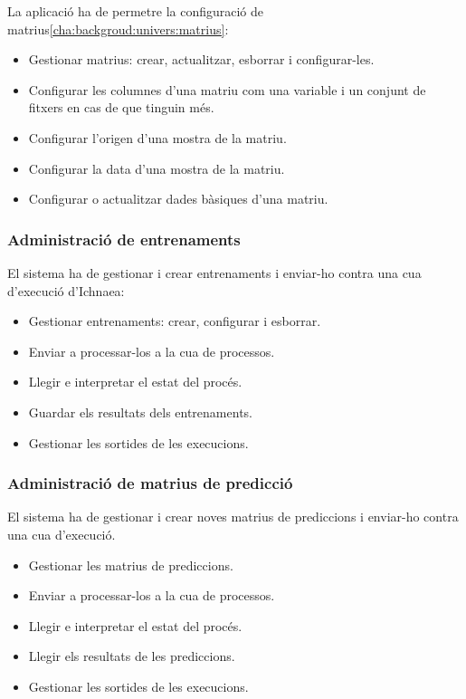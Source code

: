 La aplicaci\'{o} ha de permetre la configuraci\'{o} de matrius\ref{cha:backgroud:univers:matrius}:
\begin{itemize}
\item Gestionar matrius: crear, actualitzar, esborrar i configurar-les.
\item Configurar les columnes d'una matriu com una variable i un conjunt de fitxers en cas de que tinguin m\'{e}s.
\item Configurar l'origen d'una mostra de la matriu.
\item Configurar la data d'una mostra de la matriu.
\item Configurar o actualitzar dades b\`{a}siques d'una matriu.
\end{itemize}

\subsubsection{Administraci\'{o} de entrenaments}
El sistema ha de gestionar i crear entrenaments i enviar-ho contra una cua d'execuci\'{o} d'Ichnaea:
\begin{itemize}
	\item Gestionar entrenaments: crear, configurar i esborrar.
	\item Enviar a processar-los a la cua de processos.
	\item Llegir e interpretar el estat del proc\'{e}s.
	\item Guardar els resultats dels entrenaments.
	\item Gestionar les sortides de les execucions.
\end{itemize}

\subsubsection{Administraci\'{o} de matrius de predicci\'{o}}
El sistema ha de gestionar i crear noves matrius de prediccions i enviar-ho contra una cua d'execuci\'{o}.
\begin{itemize}
	\item Gestionar les matrius de prediccions.
	\item Enviar a processar-los a la cua de processos.
	\item Llegir e interpretar el estat del proc\'{e}s.
	\item Llegir els resultats de les prediccions.
	\item Gestionar les sortides de les execucions.
\end{itemize}

